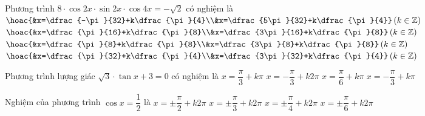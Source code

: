\begin{ex}%
Phương trình $8 \cdot \cos 2x \cdot \sin 2x \cdot \cos 4x=-\sqrt{2}$ có nghiệm là
\choice
{\True $\hoac{&x=\dfrac{-\pi}{32}+k\dfrac{\pi}{4}\\&x=\dfrac{5\pi}{32}+k\dfrac{\pi}{4}}\left( k \in \mathbb{Z} \right)$}
{$\hoac{&x=\dfrac{\pi}{16}+k\dfrac{\pi}{8}\\&x=\dfrac{3\pi}{16}+k\dfrac{\pi}{8}}\left( k \in \mathbb{Z} \right)$}
{$\hoac{&x=\dfrac{\pi}{8}+k\dfrac{\pi}{8}\\&x=\dfrac{3\pi}{8}+k\dfrac{\pi}{8}}\left( k \in \mathbb{Z} \right)$}
{$\hoac{&x=\dfrac{\pi}{32}+k\dfrac{\pi}{4}\\&x=\dfrac{3\pi}{32}+k\dfrac{\pi}{4}}\left( k \in \mathbb{Z} \right)$}
\end{ex}

\begin{ex}%
Phương trình lượng giác $\sqrt{3} \cdot \tan x+3=0$ có nghiệm là
\choice
{$x=\dfrac{\pi}{3}+k\pi$}
{$x=-\dfrac{\pi}{3}+k2\pi$}
{$x=\dfrac{\pi}{6}+k\pi$}
{\True $x=-\dfrac{\pi}{3}+k\pi$}
\end{ex}

\begin{ex}%
Nghiệm của phương trình $\cos x=\dfrac{1}{2}$ là
\choice
{$x=\pm \dfrac{\pi}{2}+k2\pi$}
{\True $x=\pm \dfrac{\pi}{3}+k2\pi$}
{$x=\pm \dfrac{\pi}{4}+k2\pi $}
{$x=\pm \dfrac{\pi}{6}+k2\pi $}
\end{ex}

